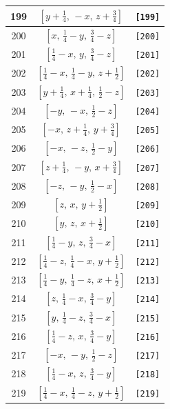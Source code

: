 \documentclass[fleqn,8pt]{jsarticle}
\begin{document}
\begin{longtable}{ccc}
199 & $\left[ y + \frac{1}{4},\, - x,\, z + \frac{3}{4} \right]$ & {\tt [199]} \\ \hline
200 & $\left[ x,\, \frac{1}{4} - y,\, \frac{3}{4} - z \right]$ & {\tt [200]} \\ \hline
201 & $\left[ \frac{1}{4} - x,\, y,\, \frac{3}{4} - z \right]$ & {\tt [201]} \\ \hline
202 & $\left[ \frac{1}{4} - x,\, \frac{1}{4} - y,\, z + \frac{1}{2} \right]$ & {\tt [202]} \\ \hline
203 & $\left[ y + \frac{1}{4},\, x + \frac{1}{4},\, \frac{1}{2} - z \right]$ & {\tt [203]} \\ \hline
204 & $\left[ - y,\, - x,\, \frac{1}{2} - z \right]$ & {\tt [204]} \\ \hline
205 & $\left[ - x,\, z + \frac{1}{4},\, y + \frac{3}{4} \right]$ & {\tt [205]} \\ \hline
206 & $\left[ - x,\, - z,\, \frac{1}{2} - y \right]$ & {\tt [206]} \\ \hline
207 & $\left[ z + \frac{1}{4},\, - y,\, x + \frac{3}{4} \right]$ & {\tt [207]} \\ \hline
208 & $\left[ - z,\, - y,\, \frac{1}{2} - x \right]$ & {\tt [208]} \\ \hline
209 & $\left[ z,\, x,\, y + \frac{1}{2} \right]$ & {\tt [209]} \\ \hline
210 & $\left[ y,\, z,\, x + \frac{1}{2} \right]$ & {\tt [210]} \\ \hline
211 & $\left[ \frac{1}{4} - y,\, z,\, \frac{3}{4} - x \right]$ & {\tt [211]} \\ \hline
212 & $\left[ \frac{1}{4} - z,\, \frac{1}{4} - x,\, y + \frac{1}{2} \right]$ & {\tt [212]} \\ \hline
213 & $\left[ \frac{1}{4} - y,\, \frac{1}{4} - z,\, x + \frac{1}{2} \right]$ & {\tt [213]} \\ \hline
214 & $\left[ z,\, \frac{1}{4} - x,\, \frac{3}{4} - y \right]$ & {\tt [214]} \\ \hline
215 & $\left[ y,\, \frac{1}{4} - z,\, \frac{3}{4} - x \right]$ & {\tt [215]} \\ \hline
216 & $\left[ \frac{1}{4} - z,\, x,\, \frac{3}{4} - y \right]$ & {\tt [216]} \\ \hline
217 & $\left[ - x,\, - y,\, \frac{1}{2} - z \right]$ & {\tt [217]} \\ \hline
218 & $\left[ \frac{1}{4} - x,\, z,\, \frac{3}{4} - y \right]$ & {\tt [218]} \\ \hline
219 & $\left[ \frac{1}{4} - x,\, \frac{1}{4} - z,\, y + \frac{1}{2} \right]$ & {\tt [219]} \\ \hline

\end{longtable}
\end{document}
